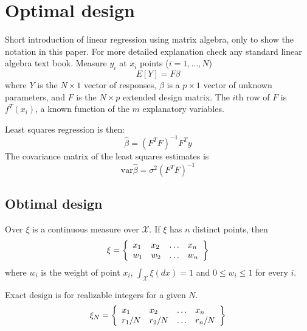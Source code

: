 \documentclass[12pt]{iopart}
\begin{document}
\section{Optimal design}
Short introduction of linear regression using matrix algebra, only to show the notation in this paper. For more detailed explanation check any standard linear algebra text book. Measure $y_i$ at $x_i$ points ($i=1, \ldots, N$)
\begin{equation}
E[Y] = F \beta
\end{equation}
where $Y$ is the $N \times 1$ vector of responses, $\beta$ is a $p \times 1$ vector of unknown parameters, and $F$ is the $N \times p$ extended design matrix. The $i$th row of $F$ is $f^T(x_i)$, a known function of the $m$ explanatory variables.

Least squares regression is then:
\begin{equation}
\hat \beta = (F^T F)^{-1} F^T y
\end{equation}
The covariance matrix of the least squares estimates is
\begin{equation}
\mathrm{var} \hat \beta = \sigma^2 (F^T F)^{-1}
\end{equation}


\subsection{Obtimal design}
Over $\xi$ is a continuous measure over $\mathcal{X}$. If $\xi$ has $n$ distinct points, then
\begin{equation}
\xi = \left\{
  \begin{array}{l l l l}
    x_1 & x_2 & \ldots & x_n\\
    w_1 & w_2 & \ldots & w_n\\
  \end{array} \right \}
\end{equation}
where $w_i$ is the weight of point $x_i$, $\int_{\mathcal{X}}\xi(dx) = 1$ and $0 \leq w_i \leq 1$ for every $i$.

Exact design is for realizable integers for a given $N$.
\begin{equation}
\xi_N = \left\{
  \begin{array}{l l l l}
    x_1 & x_2 & \ldots & x_n\\
    r_1/N & r_2/N & \ldots & r_n/N\\
  \end{array} \right \}
\end{equation}
\end{document}
